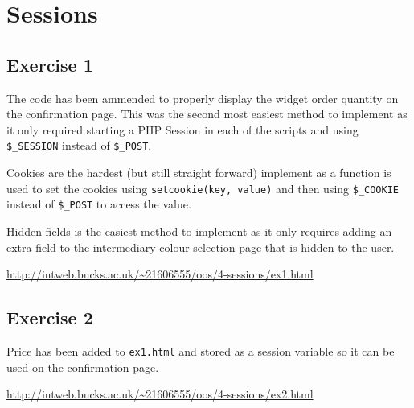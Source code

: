 \chapter{Sessions}
\graphicspath{{4-sessions/images/}}

\section{Exercise 1}

The code has been ammended to properly display the widget order quantity on the confirmation page. This was the second most easiest method to implement as it only required starting a PHP Session in each of the scripts and using \texttt{\$\_SESSION} instead of \texttt{\$\_POST}.

Cookies are the hardest (but still straight forward) implement as a function is used to set the cookies using \texttt{setcookie(key, value)} and then using \texttt{\$\_COOKIE} instead of \texttt{\$\_POST} to access the value.

Hidden fields is the easiest method to implement as it only requires adding an extra field to the intermediary colour selection page that is hidden to the user.

\url{http://intweb.bucks.ac.uk/~21606555/oos/4-sessions/ex1.html}

\captionsetup{type=figure}


\captionsetup{type=figure}


\captionsetup{type=figure}


\section{Exercise 2}

Price has been added to \texttt{ex1.html} and stored as a session variable so it can be used on the confirmation page.

\url{http://intweb.bucks.ac.uk/~21606555/oos/4-sessions/ex2.html}

\captionsetup{type=figure}


\captionsetup{type=figure}


